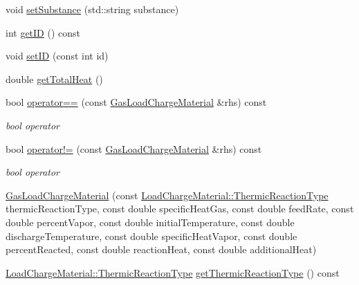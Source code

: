 \begin{DoxyCompactItemize}
void \hyperlink{class_gas_load_charge_material_a20cc3df601d8daae9b8f8e7b0c53c2e3}{set\+Substance} (std\+::string substance)
\item 
int \hyperlink{class_gas_load_charge_material_ab3e425ad095a593b7e9e365606759d9d}{get\+ID} () const
\item 
void \hyperlink{class_gas_load_charge_material_a12d67d6f764318ab09ca340884e717f9}{set\+ID} (const int id)
\item 
double \hyperlink{class_gas_load_charge_material_a4f831537652ca09c4539982c626cc164}{get\+Total\+Heat} ()
\item 
\mbox{\label{class_gas_load_charge_material_ac1d95bdf7d61d8ed98629aa17bf2c4b1}} 
bool \hyperlink{class_gas_load_charge_material_ac1d95bdf7d61d8ed98629aa17bf2c4b1}{operator==} (const \hyperlink{class_gas_load_charge_material}{Gas\+Load\+Charge\+Material} \&rhs) const
\begin{DoxyCompactList}\small\item\em bool operator \end{DoxyCompactList}\item 
\mbox{\label{class_gas_load_charge_material_ac6bc3f665a91fde01ebf6d1528cb7332}} 
bool \hyperlink{class_gas_load_charge_material_ac6bc3f665a91fde01ebf6d1528cb7332}{operator!=} (const \hyperlink{class_gas_load_charge_material}{Gas\+Load\+Charge\+Material} \&rhs) const
\begin{DoxyCompactList}\small\item\em bool operator \end{DoxyCompactList}\item 
\hyperlink{class_gas_load_charge_material_a4ad94a94d25bad9eaeca4947d879f35f}{Gas\+Load\+Charge\+Material} (const \hyperlink{namespace_load_charge_material_a51d4263e865a5d86236622dd3fe23fd1}{Load\+Charge\+Material\+::\+Thermic\+Reaction\+Type} thermic\+Reaction\+Type, const double specific\+Heat\+Gas, const double feed\+Rate, const double percent\+Vapor, const double initial\+Temperature, const double discharge\+Temperature, const double specific\+Heat\+Vapor, const double percent\+Reacted, const double reaction\+Heat, const double additional\+Heat)
\item 
\hyperlink{namespace_load_charge_material_a51d4263e865a5d86236622dd3fe23fd1}{Load\+Charge\+Material\+::\+Thermic\+Reaction\+Type} \hyperlink{class_gas_load_charge_material_ac801f30ccf58ce98fdb6b8cdb0a9767f}{get\+Thermic\+Reaction\+Type} () const

\end{DoxyCompactItemize}
